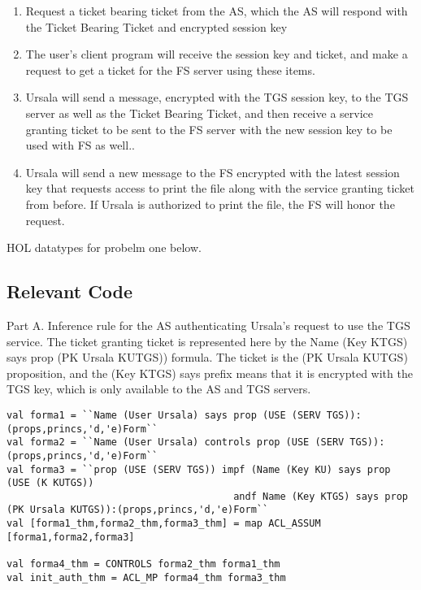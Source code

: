 \documentclass[11pt, twoside]{article}
\begin{document}
\begin{enumerate}
\item Request a ticket bearing ticket from the AS, which the AS will respond with the Ticket Bearing Ticket and encrypted session key
\item The user's client program will receive the session key and ticket, and make a request to get a ticket for the FS server using these items.
\item Ursala will send a message, encrypted with the TGS session key, to the TGS server as well as the Ticket Bearing Ticket, and then receive a service granting ticket to be sent to the FS server with the new session key to be used with FS as well..
\item Ursala will send a new message to the FS encrypted with the latest session key that requests access to print the file along with the service granting ticket from before. If Ursala is authorized to print the file, the FS will honor the request.
\end{enumerate}


HOL datatypes for probelm one below.

\HOLexamFourDatatypes


\subsection{Relevant Code}
\label{sec:relevant-code}

Part A.
Inference rule for the AS authenticating Ursala's request to use the TGS service.
The ticket granting ticket is represented here by the Name (Key KTGS) says prop (PK Ursala KUTGS)) formula.
The ticket is the (PK Ursala KUTGS) proposition, and the (Key KTGS) says prefix means that it is encrypted
with the TGS key, which is only available to the AS and TGS servers.

\HOLexamFourTheoremsinitXXauthXXthm

\lstset{frameround=fftt}
\begin{lstlisting}
val forma1 = ``Name (User Ursala) says prop (USE (SERV TGS)):(props,princs,'d,'e)Form``
val forma2 = ``Name (User Ursala) controls prop (USE (SERV TGS)):(props,princs,'d,'e)Form``
val forma3 = ``prop (USE (SERV TGS)) impf (Name (Key KU) says prop (USE (K KUTGS))
			  		 	  			   andf Name (Key KTGS) says prop (PK Ursala KUTGS)):(props,princs,'d,'e)Form``
val [forma1_thm,forma2_thm,forma3_thm] = map ACL_ASSUM [forma1,forma2,forma3]

val forma4_thm = CONTROLS forma2_thm forma1_thm
val init_auth_thm = ACL_MP forma4_thm forma3_thm

\end{lstlisting}
\end{document}
